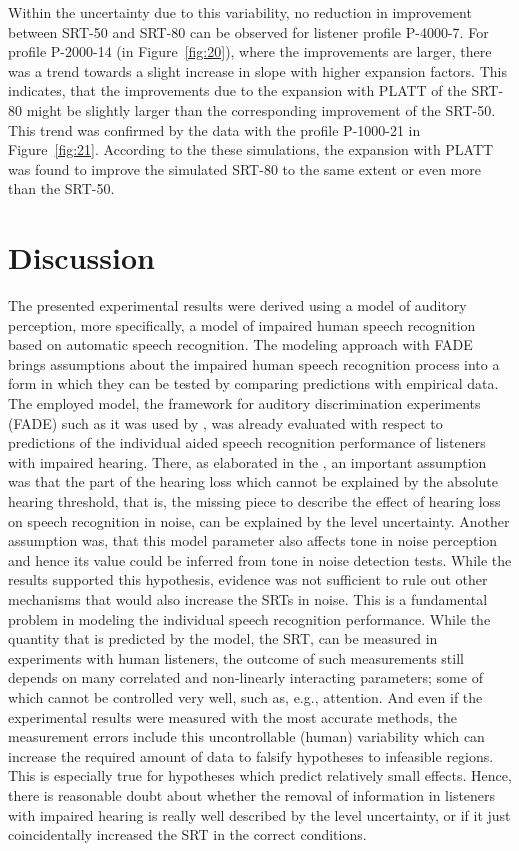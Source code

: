\documentclass[10pt,a4paper,twocolumn]{article}
\begin{document}
%
Within the uncertainty due to this variability, no reduction in improvement between SRT-50 and SRT-80 can be observed for listener profile P-4000-7.
%
For profile P-2000-14 (in Figure~\ref{fig:20}), where the improvements are larger, there was a trend towards a slight increase in slope with higher expansion factors.
%
This indicates, that the improvements due to the expansion with PLATT of the SRT-80 might be slightly larger than the corresponding improvement of the SRT-50.
%
This trend was confirmed by the data with the profile P-1000-21 in Figure~\ref{fig:21}.
%
According to the these simulations, the expansion with PLATT was found to improve the simulated SRT-80 to the same extent or even more than the SRT-50.

\section*{Discussion}
\label{sec:discussion}
%
The presented experimental results were derived using a model of auditory perception, more specifically, a model of impaired human speech recognition based on automatic speech recognition.
%
The modeling approach with FADE brings assumptions about the impaired human speech recognition process into a form in which they can be tested by comparing predictions with empirical data.
%
The employed model, the framework for auditory discrimination experiments (FADE) such as it was used by \cite{schaedler2020a}, was already evaluated with respect to predictions of the individual aided speech recognition performance of listeners with impaired hearing.
%
There, as elaborated in the , an important assumption was that the part of the hearing loss which cannot be explained by the absolute hearing threshold, that is, the missing piece to describe the effect of hearing loss on speech recognition in noise, can be explained by the level uncertainty.
%
Another assumption was, that this model parameter also affects tone in noise perception and hence its value could be inferred from tone in noise detection tests.
%
While the results supported this hypothesis, evidence was not sufficient to rule out other mechanisms that would also increase the SRTs in noise.
%
This is a fundamental problem in modeling the individual speech recognition performance.
%
While the quantity that is predicted by the model, the SRT, can be measured in experiments with human listeners, the outcome of such measurements still depends on many correlated and non-linearly interacting parameters; some of which cannot be controlled very well, such as, e.g., attention.
%
And even if the experimental results were measured with the most accurate methods, the measurement errors include this uncontrollable (human) variability which can increase the required amount of data to falsify hypotheses to infeasible regions.
%
This is especially true for hypotheses which predict relatively small effects.
%
Hence, there is reasonable doubt about whether the removal of information in listeners with impaired hearing is really well described by the level uncertainty, or if it just coincidentally increased the SRT in the correct conditions.
\end{document}
